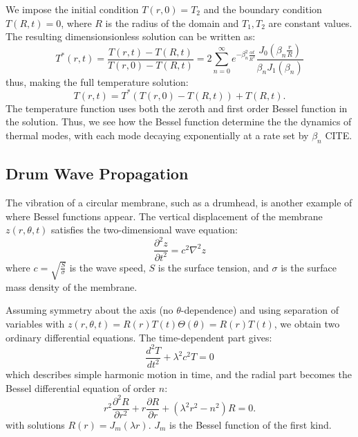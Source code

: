 \documentclass[linenumbers, twocolumn]{aastex631}
\begin{document}
\noindent We impose the initial condition $T(r,0)=T_2$ and the boundary condition
$T(R,t)=0$, where $R$ is the radius of the domain and $T_1,T_2$ are constant
values. The resulting dimensionsionless solution can be written as:
\begin{equation}
    T^*(r,t)=\frac{T(r,t)-T(R,t)}{T(r,0)-T(R,t)}=2\sum_{n=0}^\infty e^{-\beta_n^2\frac{\alpha t}{R^2}}\frac{J_0(\beta_n\frac{r}{R})}{\beta_nJ_1(\beta_n)}
\end{equation}
\noindent thus, making the full temperature solution:
\begin{equation}
    T(r,t)=T^*(T(r,0)-T(R,t))+T(R,t).
\end{equation}
\noindent The temperature function uses both the zeroth and first order
Bessel function in the solution. Thus, we see how the Bessel function determine the
the dynamics of thermal modes, with each mode decaying exponentially at a rate set
by $\beta_n$ CITE.\\


\subsection{Drum Wave Propagation}

The vibration of a circular membrane, such as a drumhead, is another example of
where Bessel functions appear. The vertical displacement of the membrane $z(r,\theta,t)$
satisfies the two-dimensional wave equation:
\begin{equation}
    \frac{\partial^2z}{\partial t^2}=c^2\nabla^2z
\end{equation}
\noindent where $c=\sqrt{\frac{S}{\sigma}}$ is the wave speed, $S$ is the surface
tension, and $\sigma$ is the surface mass density of the membrane. 

\noindent Assuming symmetry about the axis (no $\theta$-dependence) and using
separation of variables with $z(r,\theta,t)=R(r)T(t)\Theta(\theta)=R(r)T(t)$,
we obtain two ordinary differential equations. The time-dependent part gives:
\begin{equation}
    \frac{d^2T}{dt^2}+\lambda^2c^2T=0
\end{equation}
\noindent which describes simple harmonic motion in time, and the radial part
 becomes the Bessel differential equation of order $n$:
\begin{equation}
    r^2\frac{\partial^2R}{\partial r^2}+r\frac{\partial R}{\partial r}+(\lambda^2r^2-n^2)R=0.
\end{equation}
\noindent with solutions $R(r)=J_m(\lambda r)$. $J_m$ is the Bessel
function of the first kind.
\end{document}
